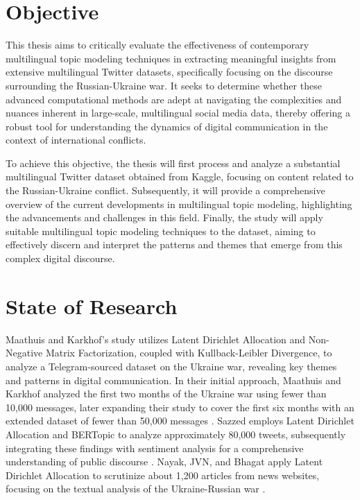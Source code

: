 \documentclass[
    11pt,
    a4paper,
    egregdoesnotlikesansseriftitles,
    toc=chapterentrywithdots,
    oneside,openright,
    titlepage,
    parskip=half,
    headings=normal,  %
    listof=totoc,
    bibliography=totoc,
    index=totoc,
    captions=tableheading,  %
    chapterprefix,
    listof=flat,
    final
]{scrbook}
\begin{document}
{\let\clearpage\relax \chapter{Objective}}
This thesis aims to critically evaluate the effectiveness of contemporary multilingual topic modeling techniques in extracting meaningful insights from extensive multilingual Twitter datasets, specifically focusing on the discourse surrounding the Russian-Ukraine war. It seeks to determine whether these advanced computational methods are adept at navigating the complexities and nuances inherent in large-scale, multilingual social media data, thereby offering a robust tool for understanding the dynamics of digital communication in the context of international conflicts.

To achieve this objective, the thesis will first process and analyze a substantial multilingual Twitter dataset obtained from Kaggle, focusing on content related to the Russian-Ukraine conflict. Subsequently, it will provide a comprehensive overview of the current developments in multilingual topic modeling, highlighting the advancements and challenges in this field. Finally, the study will apply suitable multilingual topic modeling techniques to the dataset, aiming to effectively discern and interpret the patterns and themes that emerge from this complex digital discourse.

{\let\clearpage\relax \chapter{State of Research}}
Maathuis and Karkhof's study utilizes Latent Dirichlet Allocation and Non-Negative Matrix Factorization, coupled with Kullback-Leibler Divergence, to analyze a Telegram-sourced dataset on the Ukraine war, revealing key themes and patterns in digital communication.
In their initial approach, Maathuis and Karkhof analyzed the first two months of the Ukraine war using fewer than 10,000 messages, later expanding their study to cover the first six months with an extended dataset of fewer than 50,000 messages \cite{TopicModellingTelegram1,TopicModellingTelegram2}. 
Sazzed employs Latent Dirichlet Allocation and BERTopic to analyze approximately 80,000 tweets, subsequently integrating these findings with sentiment analysis for a comprehensive understanding of public discourse \cite{TopicTwitterLDABERt}. 
Nayak, JVN, and Bhagat apply Latent Dirichlet Allocation to scrutinize about 1,200 articles from news websites, focusing on the textual analysis of the Ukraine-Russian war \cite{SocialMediaanalysis}.
\end{document}
